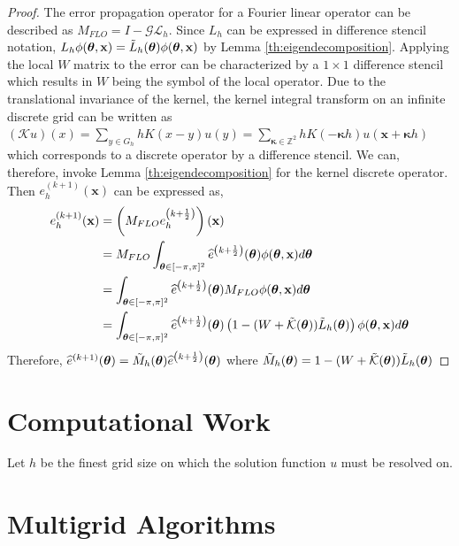 \documentclass[12pt]{article}
\begin{document}
\begin{proof}
    The error propagation operator for a Fourier linear operator can be described as $M_{FLO} = I - \mathcal{G}\mathcal{L}_h$. Since $L_h$ can be expressed in difference stencil notation,  $L_h \phi(\boldsymbol{\theta}, \mathbf{x}) = \Tilde{L}_h(\boldsymbol{\theta})\phi(\boldsymbol{\theta}, \mathbf{x})$ by Lemma \ref{th:eigendecomposition}. Applying the local $W$ matrix to the error can be characterized by a $1 \times 1$ difference stencil which results in $W$ being the symbol of the local operator. Due to the translational invariance of the kernel, the kernel integral transform on an infinite discrete grid can be written as  $(\mathcal{K}u)(x) =  \sum_{y \in G_h}hK(x - y)u(y) = \sum_{\boldsymbol{\kappa} \in \mathbb{Z}^2}hK(-\boldsymbol{\kappa}h)u(\mathbf{x} + \boldsymbol{\kappa}h)$ which corresponds to a discrete operator by a difference stencil. We can, therefore, invoke Lemma \ref{th:eigendecomposition} for the kernel discrete operator. Then $e^{(k + 1)}_h(\mathbf{x})$ can be expressed as, 
    \begin{align*}
        e^{(k + 1)}_h(\mathbf{x}) &= \left(M_{FLO} e^{\left(k + \frac{1}{2}\right)}_h\right)(\mathbf{x}) \\
        &= M_{FLO} \int_{\boldsymbol{\theta} \in [-\pi, \pi]^2}  \widehat{e}^{\left(k + \frac{1}{2}\right)}(\boldsymbol{\theta})\phi(\boldsymbol{\theta},\mathbf{x})d\boldsymbol{\theta} \\
        &= \int_{\boldsymbol{\theta} \in [-\pi, \pi]^2}  \widehat{e}^{\left(k + \frac{1}{2}\right)}(\boldsymbol{\theta}) M_{FLO} \phi(\boldsymbol{\theta},\mathbf{x})d\boldsymbol{\theta} \\
        &= \int_{\boldsymbol{\theta} \in [-\pi, \pi]^2}  \widehat{e}^{\left(k + \frac{1}{2}\right)}(\boldsymbol{\theta}) \left(1 - (W + \Tilde{\mathcal{K}}(\boldsymbol{\theta}))\Tilde{L}_h(\boldsymbol{\theta})\right) \phi(\boldsymbol{\theta},\mathbf{x})d\boldsymbol{\theta}
    \end{align*}
    Therefore, $\widehat{e}^{(k + 1)}(\boldsymbol{\theta}) = \Tilde{M}_{h}(\boldsymbol{\theta})\widehat{e}^{\left(k + \frac{1}{2}\right)}(\boldsymbol{\theta})$ where $\Tilde{M}_{h}(\boldsymbol{\theta}) = 1 - (W + \Tilde{\mathcal{K}}(\boldsymbol{\theta}))\Tilde{L}_h(\boldsymbol{\theta})$
\end{proof}

\section{Computational Work}

Let $h$ be the finest grid size on which the solution function $u$ must be resolved on. 

\section{Multigrid Algorithms} \label{sec:multigrid}

\end{document}
